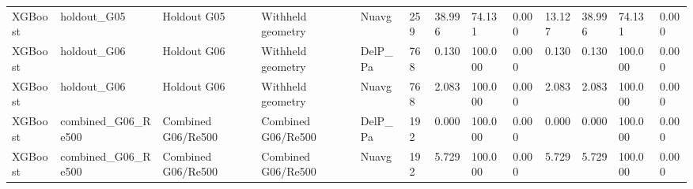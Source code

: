 \begin{tabular}{lllllllllllll}
XGBoost & holdout_G05 & Holdout G05 & Withheld geometry & Nuavg & 259 & 38.996 & 74.131 & 0.000 & 13.127 & 38.996 & 74.131 & 0.000 \\
XGBoost & holdout_G06 & Holdout G06 & Withheld geometry & DelP_Pa & 768 & 0.130 & 100.000 & 0.000 & 0.130 & 0.130 & 100.000 & 0.000 \\
XGBoost & holdout_G06 & Holdout G06 & Withheld geometry & Nuavg & 768 & 2.083 & 100.000 & 0.000 & 2.083 & 2.083 & 100.000 & 0.000 \\
XGBoost & combined_G06_Re500 & Combined G06/Re500 & Combined G06/Re500 & DelP_Pa & 192 & 0.000 & 100.000 & 0.000 & 0.000 & 0.000 & 100.000 & 0.000 \\
XGBoost & combined_G06_Re500 & Combined G06/Re500 & Combined G06/Re500 & Nuavg & 192 & 5.729 & 100.000 & 0.000 & 5.729 & 5.729 & 100.000 & 0.000 \\
\hline
\end{tabular}
